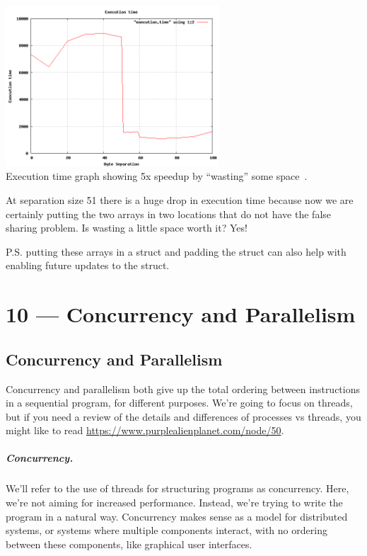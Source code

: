 \documentclass[a4paper]{report}
\begin{document}
\begin{center}
\includegraphics[width=0.6\textwidth]{images/falsesharing.png}\\
Execution time graph showing 5x speedup by ``wasting'' some space~\cite{falsesharing}.
\end{center}

At separation size 51 there is a huge drop in execution time because now we are certainly putting the two arrays in two locations that do not have the false sharing problem. Is wasting a little space worth it? Yes!

P.S. putting these arrays in a struct and padding the struct can also help with enabling future updates to the struct.









\chapter*{10 --- Concurrency and Parallelism}


\section*{Concurrency and Parallelism}
Concurrency and parallelism both give up the
total ordering between instructions in a sequential program, for
different purposes. We're going to focus on threads, but if you need a review of the details and differences of processes vs threads, you might like to read   \url{https://www.purplealienplanet.com/node/50}. 

\paragraph{Concurrency.} We'll refer to the use of threads for
structuring programs as concurrency. Here, we're not aiming
for increased performance. Instead, we're trying to write the program
in a natural way. Concurrency makes sense as a model for distributed
systems, or systems where multiple components interact, with no ordering
between these components, like graphical user interfaces.
\end{document}
